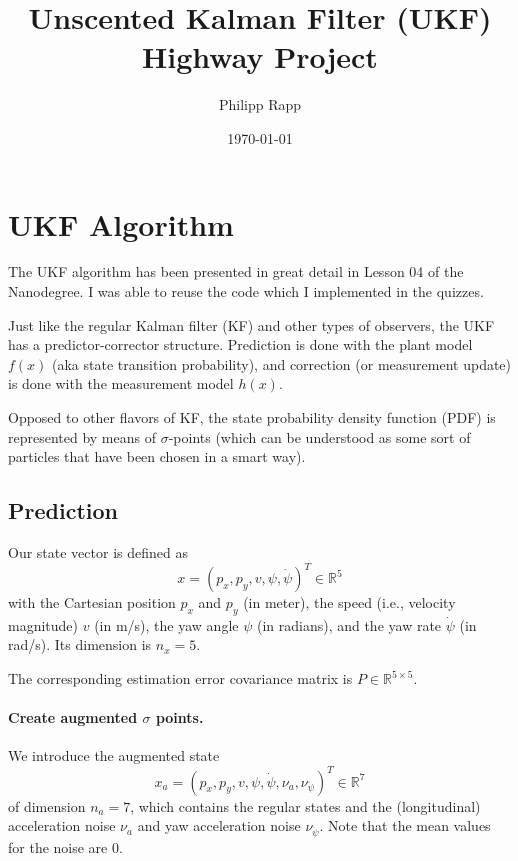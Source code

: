\documentclass{scrartcl}
\title{Unscented Kalman Filter (UKF) Highway Project}
\author{Philipp Rapp}
\date{\today}
\begin{document}
\maketitle

\section{UKF Algorithm}
The UKF algorithm has been presented in great detail in Lesson 04 of the Nanodegree.
I was able to reuse the code which I implemented in the quizzes.

Just like the regular Kalman filter (KF) and other types of observers, the UKF
has a predictor-corrector structure. Prediction is done with the plant model $f(x)$
(aka state transition probability), and correction (or measurement update) is done
with the measurement model $h(x)$.

Opposed to other flavors of KF, the state probability density function (PDF)
is represented by means of $\sigma$-points (which can be understood as
some sort of particles that have been chosen in a smart way).

\subsection{Prediction}
Our state vector is defined as
\begin{equation}
	x = \left( p_x, p_y, v, \psi, \dot{\psi} \right)^T \in \mathbb{R}^5
\end{equation}
with the Cartesian position $p_x$ and $p_y$ (in meter),
the speed (i.e., velocity magnitude) $v$ (in m/s),
the yaw angle $\psi$ (in radians),
and the yaw rate $\dot{\psi}$ (in rad/s).
Its dimension is $n_x = 5$.

The corresponding estimation error covariance matrix is $P \in \mathbb{R}^{5 \times 5}$.

\paragraph{Create augmented $\sigma$ points.}
We introduce the augmented state
\begin{equation}
	x_a = \left( p_x, p_y, v, \psi, \dot{\psi}, \nu_a, \nu_{\ddot{\psi}} \right)^T \in \mathbb{R}^7
\end{equation}
of dimension $n_a = 7$, which contains the regular states
and the (longitudinal) acceleration noise $\nu_a$ and yaw acceleration noise $\nu_{\ddot{\psi}}$.
Note that the mean values for the noise are 0.
\end{document}
